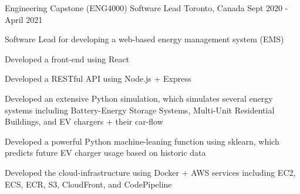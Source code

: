 


\begin{cventries}


\cventry
{Engineering Capstone (ENG4000)} %
{Software Lead} %
{Toronto, Canada} %
{Sept 2020 - April 2021} %
{ %
\begin{cvitems}
\item {Software Lead for developing a web-based energy management system (EMS)}
\item {Developed a front-end using React}
\item {Developed a RESTful API using Node.js + Express}
\item {Developed an extensive Python simulation, which simulates several energy systems including Battery-Energy Storage Systems, Multi-Unit Residential Buildings, and EV chargers + their car-flow}
\item {Developed a powerful Python machine-leaning function using sklearn, which predicts future EV charger usage based on historic data}
\item {Developed the cloud-infrastructure using Docker + AWS services including EC2, ECS, ECR, S3, CloudFront, and CodePipeline}
\end{cvitems}
}


\end{cventries}